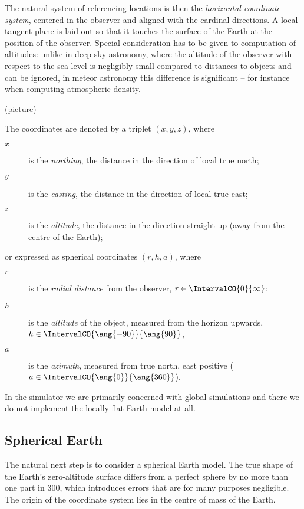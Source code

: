         The natural system of referencing locations is then the \emph{horizontal coordinate system},
        centered in the observer and aligned with the cardinal directions.
        A local tangent plane is laid out so that it touches the surface of the Earth
        at the position of the observer. Special consideration has to be given to computation of altitudes:
        unlike in deep-sky astronomy, where the altitude of the observer with respect to the sea level
        is negligibly small compared to distances to objects and can be ignored, in meteor astronomy
        this difference is significant -- for instance when computing atmospheric density.

        (picture)

        The coordinates are denoted by a triplet $(x, y, z)$, where
        \begin{description}
            \item[$x$]  is the \emph{northing}, the distance in the direction of local true north;
            \item[$y$]  is the \emph{easting}, the distance in the direction of local true east;
            \item[$z$]  is the \emph{altitude}, the distance in the direction straight up
                (away from the centre of the Earth);
        \end{description}
        or expressed as spherical coordinates $(r, h, a)$, where
        \begin{description}
            \item[$r$]  is the \emph{radial distance} from the observer,
                $r \in \IntervalCO{0}{\infty}$;
            \item[$h$]  is the \emph{altitude} of the object, measured from the horizon upwards,
                $h \in \IntervalCO{\ang{-90}}{\ang{90}}$,
            \item[$a$]  is the \emph{azimuth}, measured from true north, east positive
                ($a \in \IntervalCO{\ang{0}}{\ang{360}}$).
        \end{description}

        In the simulator we are primarily concerned with global simulations
        and there we do not implement the locally flat Earth model at all.

    \subsection{Spherical Earth} \label{mEs}
        The natural next step is to consider a spherical Earth model.
        The true shape of the Earth's zero-altitude surface differs from
        a perfect sphere by no more than one part in 300, which introduces errors
        that are for many purposes negligible.
        The origin of the coordinate system lies in the centre of mass of the Earth.

